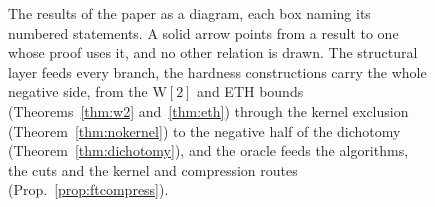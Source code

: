 \begin{figure}[H]
{%
  }
  \caption{The results of the paper as a diagram, each box naming its
  numbered statements. A solid arrow points from a result to one whose
  proof uses it, and no other relation is drawn. The structural layer
  feeds every branch, the hardness constructions carry the whole
  negative side, from the $\mathrm{W}[2]$ and ETH bounds
  (Theorems~\ref{thm:w2} and~\ref{thm:eth}) through the kernel
  exclusion (Theorem~\ref{thm:nokernel}) to the negative half of the
  dichotomy (Theorem~\ref{thm:dichotomy}), and the oracle feeds the
  algorithms, the cuts and the kernel and compression routes
  (Prop.~\ref{prop:ftcompress}).}
  \label{fig:resultsmap}
\end{figure}
